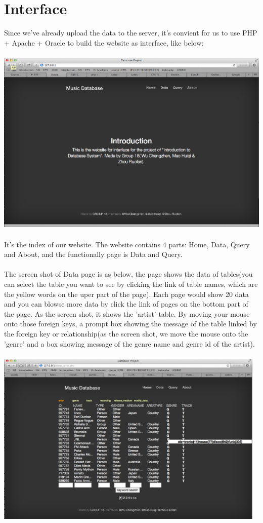 \documentclass[11pt]{article} %
\begin{document}
{\section{Interface}
Since we've already upload the data to the server, it's convient for us to use PHP + Apache + Oracle to build the website as interface, like below:\\ \\
\includegraphics[width=14cm]{interface1}\\ \\
It's the index of our website. The website contains 4 parts: Home, Data, Query and About, and the functionally page is Data and Query.\\ \\
The screen shot of Data page is as below, the page shows the data of tables(you can select the table you want to see by clicking the link of table names, which are the yellow words on the uper part of the page). Each page would show 20 data and you can blowse more data by click the link of pages on the bottom part of the page. As the screen shot, it shows the 'artist' table. By moving your mouse onto those foreign keys, a prompt box showing the message of the table linked by the foreign key or relationship(as the screen shot, we move the mouse onto the 'genre' and a box showing message of the genre name and genre id of the artist).\\ \\
\includegraphics[width=13cm]{interface2}\\ \\
}
\end{document}
